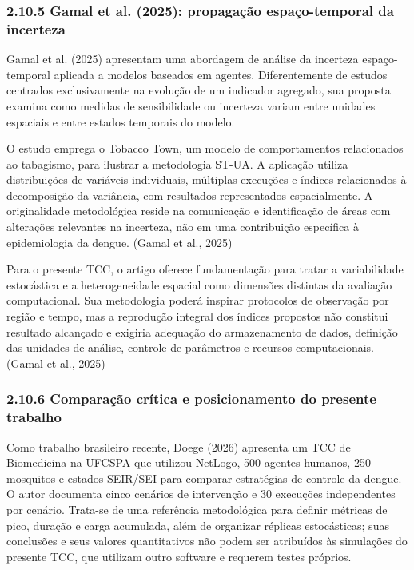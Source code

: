 \subsubsection{2.10.5 Gamal et al. (2025): propagação espaço-temporal da
incerteza}\label{gamal-et-al.-2025-propagauxe7uxe3o-espauxe7o-temporal-da-incerteza}

Gamal et al. (2025) apresentam uma abordagem de análise da incerteza
espaço-temporal aplicada a modelos baseados em agentes. Diferentemente
de estudos centrados exclusivamente na evolução de um indicador
agregado, sua proposta examina como medidas de sensibilidade ou
incerteza variam entre unidades espaciais e entre estados temporais do
modelo.

O estudo emprega o Tobacco Town, um modelo de comportamentos
relacionados ao tabagismo, para ilustrar a metodologia ST-UA. A
aplicação utiliza distribuições de variáveis individuais, múltiplas
execuções e índices relacionados à decomposição da variância, com
resultados representados espacialmente. A originalidade metodológica
reside na comunicação e identificação de áreas com alterações relevantes
na incerteza, não em uma contribuição específica à epidemiologia da
dengue. (Gamal et al., 2025)

Para o presente TCC, o artigo oferece fundamentação para tratar a
variabilidade estocástica e a heterogeneidade espacial como dimensões
distintas da avaliação computacional. Sua metodologia poderá inspirar
protocolos de observação por região e tempo, mas a reprodução integral
dos índices propostos não constitui resultado alcançado e exigiria
adequação do armazenamento de dados, definição das unidades de análise,
controle de parâmetros e recursos computacionais. (Gamal et al., 2025)

\subsubsection{2.10.6 Comparação crítica e posicionamento do presente
trabalho}\label{comparauxe7uxe3o-cruxedtica-e-posicionamento-do-presente-trabalho}

Como trabalho brasileiro recente, Doege (2026) apresenta um TCC de
Biomedicina na UFCSPA que utilizou NetLogo, 500 agentes humanos, 250
mosquitos e estados SEIR/SEI para comparar estratégias de controle da
dengue. O autor documenta cinco cenários de intervenção e 30 execuções
independentes por cenário. Trata-se de uma referência metodológica para
definir métricas de pico, duração e carga acumulada, além de organizar
réplicas estocásticas; suas conclusões e seus valores quantitativos não
podem ser atribuídos às simulações do presente TCC, que utilizam outro
software e requerem testes próprios.

